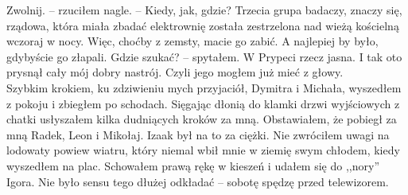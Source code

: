 \documentclass[../MAIN.tex]{subfiles}
\begin{document}
\xx Zwolnij. -- rzuciłem nagle. -- Kiedy, jak, gdzie?
\xx Trzecia grupa badaczy, znaczy się, rządowa, która miała zbadać elektrownię została zestrzelona nad wieżą kościelną wczoraj w nocy. Więc, choćby z zemsty, macie go zabić. A najlepiej by było, gdybyście go złapali.
\xx Gdzie szukać? -- spytałem.
\xx W Prypeci rzecz jasna.
\qd
I tak oto prysnął cały mój dobry nastrój. Czyli jego mogłem już mieć z głowy.\\
Szybkim krokiem, ku zdziwieniu mych przyjaciół, Dymitra i Michała, wyszedłem z pokoju i zbiegłem po schodach. Sięgając dłonią do klamki drzwi wyjściowych z chatki usłyszałem kilka dudniących kroków za mną. Obstawiałem, że pobiegł za mną Radek, Leon i Mikołaj. Izaak był na to za ciężki.
Nie zwróciłem uwagi na lodowaty powiew wiatru, który niemal wbił mnie w ziemię swym chłodem, kiedy wyszedłem na plac. Schowałem prawą rękę w kieszeń i udałem się do ,,nory'' Igora. Nie było sensu tego dłużej odkładać -- sobotę spędzę przed telewizorem.
\end{document}
